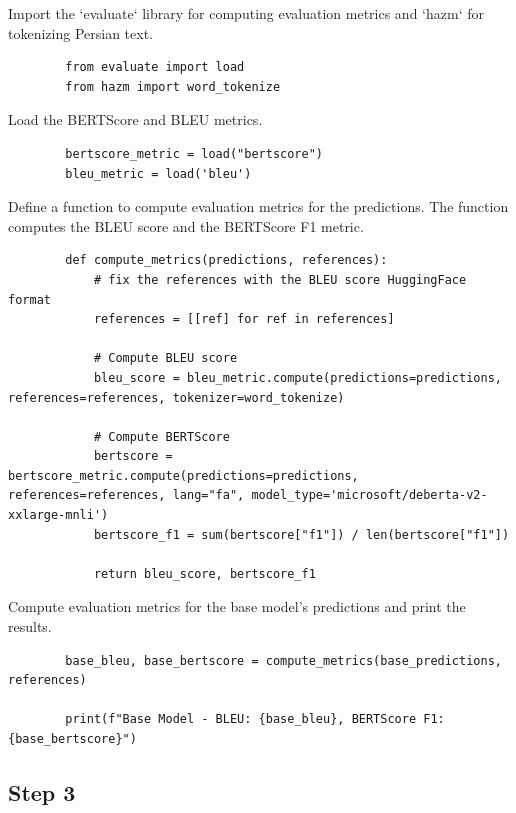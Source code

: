 \documentclass{solutionclass} %
\begin{document}
\begin{solution}
	Import the `evaluate` library for computing evaluation metrics and `hazm` for tokenizing Persian text.
	\begin{lstlisting}
		from evaluate import load
		from hazm import word_tokenize
	\end{lstlisting}
\end{solution}

\begin{solution}
	Load the BERTScore and BLEU metrics.
	\begin{lstlisting}
		bertscore_metric = load("bertscore")
		bleu_metric = load('bleu')
	\end{lstlisting}
\end{solution}

\begin{solution}
	Define a function to compute evaluation metrics for the predictions. The function computes the BLEU score and the BERTScore F1 metric.
	\begin{lstlisting}
		def compute_metrics(predictions, references):
			# fix the references with the BLEU score HuggingFace format
			references = [[ref] for ref in references]
		
			# Compute BLEU score
			bleu_score = bleu_metric.compute(predictions=predictions, references=references, tokenizer=word_tokenize)
		
			# Compute BERTScore
			bertscore = bertscore_metric.compute(predictions=predictions, references=references, lang="fa", model_type='microsoft/deberta-v2-xxlarge-mnli')
			bertscore_f1 = sum(bertscore["f1"]) / len(bertscore["f1"])
		
			return bleu_score, bertscore_f1
		\end{lstlisting}
\end{solution}

\begin{solution}
	Compute evaluation metrics for the base model's predictions and print the results.
	\begin{lstlisting}
		base_bleu, base_bertscore = compute_metrics(base_predictions, references)
		
		print(f"Base Model - BLEU: {base_bleu}, BERTScore F1: {base_bertscore}")
	\end{lstlisting}
\end{solution}


\subsection*{Step 3}
\end{document}
